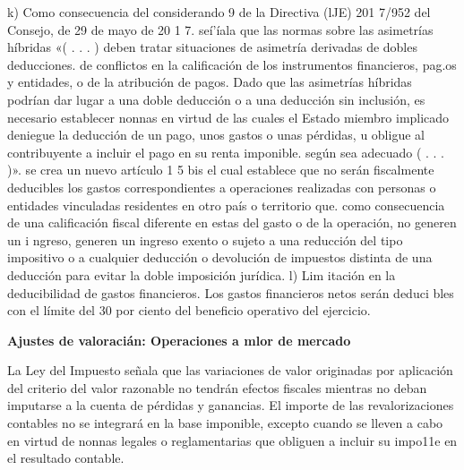 \documentclass[10pt,a4paper]{article}
\begin{document}
k) Como consecuencia del considerando 9 de la Directiva (lJE) 201 7/952 del Consejo, de 29 de mayo de 20 1 7. seí'íala que las normas sobre las asimetrías híbridas «( . . . ) deben tratar situaciones de asimetría derivadas de dobles deducciones. de conflictos en la calificación de los instrumentos financieros, pag.os y entidades, o de la atribución de pagos. Dado que las asimetrías híbridas podrían dar lugar a una doble deducción o a una deducción sin inclusión, es necesario establecer nonnas en virtud de las cuales el Estado miembro implicado deniegue la deducción de un pago, unos gastos o unas pérdidas, u obligue al contribuyente a incluir el pago en su renta imponible. según sea adecuado ( . . . )». se crea un nuevo artículo 1 5 bis el cual establece que no serán fiscalmente deducibles los gastos correspondientes a operaciones realizadas con personas o entidades vinculadas residentes en otro país o territorio que. como consecuencia de una calificación fiscal diferente en estas del gasto o de la operación, no generen un i ngreso, generen  un ingreso exento o sujeto a una reducción del tipo impositivo o a cualquier deducción o devolución de impuestos distinta de una deducción para evitar la doble imposición jurídica.
l) Lim itación en la deducibilidad de gastos financieros. Los gastos financieros netos serán deduci bles con el límite del 30 por ciento del beneficio operativo del ejercicio. 


\textbf{Ajustes de valoracián: Operaciones a mlor de mercado}

La Ley del Impuesto señala que las variaciones de valor originadas por aplicación del criterio del valor razonable no tendrán efectos fiscales mientras no deban imputarse a la cuenta de pérdidas y ganancias. El importe de las revalorizaciones contables no se integrará en la base imponible, excepto cuando se lleven a cabo en virtud de nonnas legales o reglamentarias que obliguen a incluir su impo11e en el resultado contable.
\end{document}
